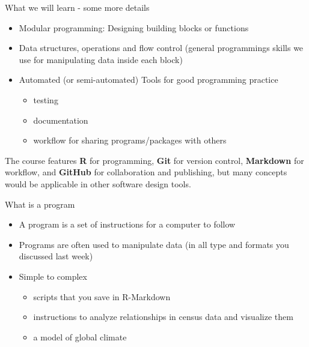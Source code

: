 \documentclass[
  ignorenonframetext,
]{beamer}
\providecommand{\tightlist}{%
  \setlength{\itemsep}{0pt}\setlength{\parskip}{0pt}}
\begin{document}
\begin{frame}{What we will learn - some more details}
\protect\hypertarget{what-we-will-learn---some-more-details}{}

\begin{itemize}
\item
  Modular programming: Designing building blocks or functions
\item
  Data structures, operations and flow control (general programmings
  skills we use for manipulating data inside each block)
\item
  Automated (or semi-automated) Tools for good programming practice

  \begin{itemize}
  \tightlist
  \item
    testing
  \item
    documentation
  \item
    workflow for sharing programs/packages with others
  \end{itemize}
\end{itemize}

The course features \textbf{R} for programming, \textbf{Git} for version
control, \textbf{Markdown} for workflow, and \textbf{GitHub} for
collaboration and publishing, but many concepts would be applicable in
other software design tools.

\end{frame}

\begin{frame}{What is a program}
\protect\hypertarget{what-is-a-program}{}

\begin{itemize}
\item
  A program is a set of instructions for a computer to follow
\item
  Programs are often used to manipulate data (in all type and formats
  you discussed last week)
\item
  Simple to complex

  \begin{itemize}
  \tightlist
  \item
    scripts that you save in R-Markdown
  \item
    instructions to analyze relationships in census data and visualize
    them
  \item
    a model of global climate
  \end{itemize}
\end{itemize}

\end{frame}
\end{document}
